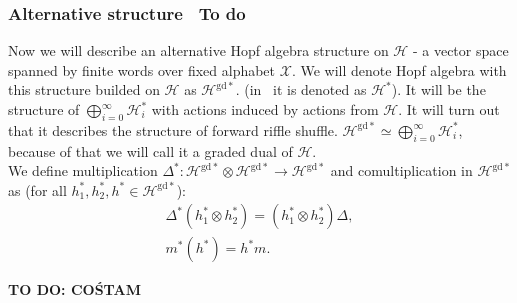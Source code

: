 \documentclass[a4paper, 12pt]{report}
\newcommand{\todo}[1]{\hfill \break \textbf{\Huge TO DO: #1 \hfill \break}\normalsize}
\newcommand{\smalltodo}[1]{\textbf{\ To do}}
\newcommand{\gdd}[1]{#1^{\mathrm{gd}*}}
\begin{document}
\subsubsection{Alternative structure \smalltodo{a}}
\indent Now we will describe an alternative Hopf algebra structure on $\mathcal{H}$ - a vector space spanned 
by finite words over fixed alphabet $\mathcal{X}$. We will denote Hopf algebra with this structure builded on 
$\mathcal{H}$
as $\mathcal{H}^{\mathrm{gd}*}$. (in~\cite{Diaconis2014} it is denoted as $\mathcal{H}^*$).  It will be the 
structure of $\displaystyle\bigoplus^{\infty}_{i = 0} \mathcal{H}_i^*$ with actions induced by actions from 
$\mathcal{H}$. It will turn out that it describes the structure of forward riffle shuffle.  
$\mathcal{H}^{\mathrm{gd}*} \simeq \displaystyle\bigoplus^{\infty}_{i = 0} \mathcal{H}_i^*$, because of that 
we will call it a graded dual of $\mathcal{H}$. \\
\indent We define multiplication 
$\Delta^* : \mathcal{H}^{\mathrm{gd}*} \otimes \gdd{\mathcal{H}} \to \gdd{\mathcal{H}}$ and 
comultiplication 
\text{$m^* : \gdd{\mathcal{H}} \to \gdd{\mathcal{H}} \otimes \gdd{\mathcal{H}}$} in $\gdd{\mathcal{H}}$ as 
(for all $h_1^*, h_2^*, h^* \in \gdd{\mathcal{H}}$):
\begin{align*}
\Delta^*(h_1^* \otimes h_2^*) = (h_1^* \otimes h_2^*)\Delta, \\
m^*(h^*) = h^*m.
\end{align*}



\todo{COŚTAM}
\end{document}
